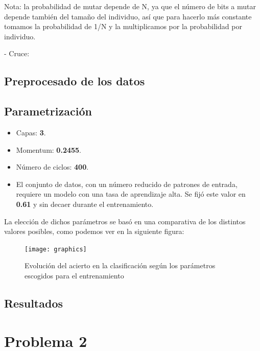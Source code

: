 \documentclass[12pt]{article}
\begin{document}
Nota: la probabilidad de mutar depende de N, ya que el número de bits a mutar depende también del tamaño del individuo, así que para hacerlo más constante tomamos la probabilidad de 1/N y la multiplicamos por la probabilidad por individuo.


- Cruce:

\subsection{Preprocesado de los datos}

\subsection{Parametrización}

\begin{itemize}
    \setlength\itemsep{0em}
    \item Capas: \textbf{3}.
    \item Momentum: \textbf{0.2455}.
    \item Número de ciclos: \textbf{400}.
    \item El conjunto de datos, con un número reducido de patrones de
    entrada, requiere un modelo con una tasa de aprendizaje alta. Se fijó este
    valor en \textbf{0.61} y sin decaer durante el entrenamiento.
\end{itemize}

La elección de dichos parámetros se basó en una comparativa de los distintos
valores posibles, como podemos ver en la siguiente figura:

\begin{figure}[h]
    \center
    \texttt{[image: graphics]}
    \caption{Evolución del acierto en la clasificación según los parámetros escogidos para el entrenamiento}
    \label{}
\end{figure}

\subsection{Resultados}


\newpage

\section{Problema 2}
\end{document}
